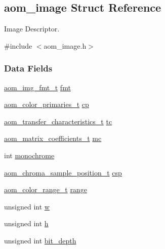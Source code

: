 \hypertarget{structaom__image}{}\subsection{aom\+\_\+image Struct Reference}
\label{structaom__image}


Image Descriptor.  




{\ttfamily \#include $<$aom\+\_\+image.\+h$>$}

\subsubsection*{Data Fields}
\begin{DoxyCompactItemize}
\item 
\hyperlink{aom__image_8h_ab71efff8c7f49380fad23b93bc2e9bfc}{aom\+\_\+img\+\_\+fmt\+\_\+t} \hyperlink{structaom__image_a6c64b1ab918d80d52eb8f5d6d957e825}{fmt}
\item 
\hyperlink{aom__image_8h_ad72aacc083639c415fe2b4a12ea2e9e9}{aom\+\_\+color\+\_\+primaries\+\_\+t} \hyperlink{structaom__image_aeff339c4b3d37ce2528bce37418bdaa6}{cp}
\item 
\hyperlink{aom__image_8h_aad2d14d16ce5f24c6225f716a0a30563}{aom\+\_\+transfer\+\_\+characteristics\+\_\+t} \hyperlink{structaom__image_aa7f7bf00699076f824460be08a0e1e65}{tc}
\item 
\hyperlink{aom__image_8h_a9994d1b5fe7cc98d54b26859d610a1cc}{aom\+\_\+matrix\+\_\+coefficients\+\_\+t} \hyperlink{structaom__image_a47c4dda09afa07d6eb0dd0de8cd31838}{mc}
\item 
int \hyperlink{structaom__image_ab7886616025ff8bd0bb96d967fca9ad8}{monochrome}
\item 
\hyperlink{aom__image_8h_a48f259fc7774b1c799b3ebe7530c19bd}{aom\+\_\+chroma\+\_\+sample\+\_\+position\+\_\+t} \hyperlink{structaom__image_a4f235c521bc95a061e9e0b2a3d5d457e}{csp}
\item 
\hyperlink{aom__image_8h_ab7754f796b26c07a78bb338b38f8df67}{aom\+\_\+color\+\_\+range\+\_\+t} \hyperlink{structaom__image_abcab05cb3e14a6391b9758f1954160d6}{range}
\item 
unsigned int \hyperlink{structaom__image_a695141e492ab146dc15e8131827eb237}{w}
\item 
unsigned int \hyperlink{structaom__image_a3fcffff0a25a4fd9218ed38842014ef2}{h}
\item 
unsigned int \hyperlink{structaom__image_a46ed9ffd741938d306a0db5a24bdcf8e}{bit\+\_\+depth}
\item 

\end{DoxyCompactItemize}
